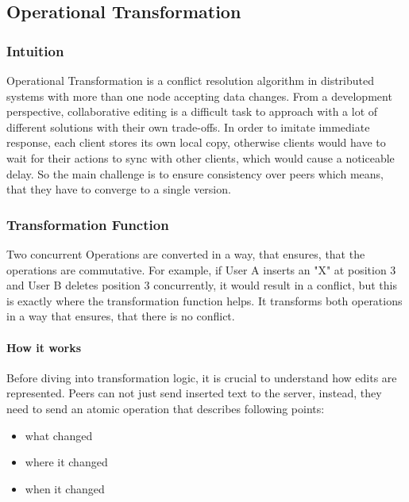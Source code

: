 \subsection{Operational Transformation}

\subsubsection{Intuition}

Operational Transformation is a conflict resolution algorithm in distributed systems
with more than one node accepting data changes. From a development perspective, collaborative
editing is a difficult task to approach with a lot of different solutions with their own trade-offs.
In order to imitate immediate response, each client stores its own local copy, otherwise clients would have to
wait for their actions to sync with other clients, which would cause a noticeable delay.
So the main challenge is to ensure consistency over peers which means, that they have to converge to a single version.

\subsubsection{Transformation Function}

Two concurrent Operations are converted in a way, that ensures, that the operations are commutative.
For example, if User A inserts an "X" at position 3 and User B deletes position 3 concurrently, it would
result in a conflict, but this is exactly where the transformation function helps. It transforms both
operations in a way that ensures, that there is no conflict.

\paragraph{How it works}

Before diving into transformation logic, it is crucial to understand how edits are represented.
Peers can not just send inserted text to the server, instead, they need to send an atomic operation
that describes following points:

\begin{itemize}
    \item what changed
    \item where it changed
    \item when it changed
\end{itemize}

